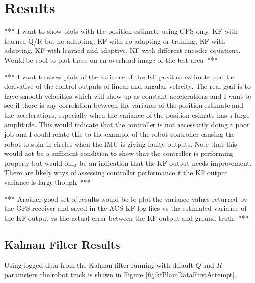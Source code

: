 \chapter{Results}
\label{ch:results}
*** I want to show plots with the position estimate using GPS only, KF with learned Q/R but no adapting, KF with no adapting or training, KF with adapting, KF with learned and adaptive, KF with different encoder equations. Would be cool to plot these on an overhead image of the test area. ***

*** I want to show plots of the variance of the KF position estimate and the derivative of the control outputs of linear and angular velocity. The real goal is to have smooth velocities which will show up as constant accelerations and I want to see if there is any correlation between the variance of the position estimate and the accelerations, especially when the variance of the position esimate has a large amplitude. This would indicate that the controller is not necessarily doing a poor job and I could relate this to the example of the robot controller causing the robot to spin in circles when the IMU is giving faulty outputs. Note that this would not be a sufficient condition to show that the controller is performing properly but would only be an indication that the KF output needs improvement. There are likely ways of assessing controller performance if the KF output variance is large though. ***

*** Another good set of results would be to plot the variance values returned by the GPS receiver and saved in the ACS KF log files vs the estimated variance of the KF output vs the actual error between the KF output and ground truth. ***

\section{Kalman Filter Results}
\label{sec:kfResults}
Using logged data from the Kalman filter running with default $Q$ and $R$ parameters the robot track is shown in Figure \ref{fig:kfPlainDataFirstAttempt}.

